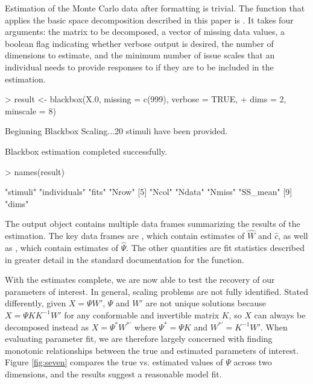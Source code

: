 \documentclass[nojss]{jss}
\begin{document}
Estimation of the Monte Carlo data after formatting is trivial. The function that applies the basic space
decomposition described in this paper is .  It takes four arguments: the matrix to
be decomposed, a vector of missing data values, a boolean flag indicating whether verbose output is
desired, the number of dimensions to estimate, and the minimum number of issue scales that an individual
needs to provide responses to if they are to be included in the estimation.

\begin{Schunk}
\begin{Sinput}
> result <- blackbox(X.0, missing = c(999), verbose = TRUE, 
+     dims = 2, minscale = 8)
\end{Sinput}
\begin{Soutput}
	Beginning Blackbox Scaling...20 stimuli have been provided.

	Blackbox estimation completed successfully.
\end{Soutput}
\begin{Sinput}
> names(result)
\end{Sinput}
\begin{Soutput}
[1] "stimuli"     "individuals" "fits"        "Nrow"       
[5] "Ncol"        "Ndata"       "Nmiss"       "SS_mean"    
[9] "dims"       
\end{Soutput}
\end{Schunk}

The output object contains multiple data frames summarizing the results of the estimation. The key data
frames are , which contain estimates of $\hat{W}$ and $\hat{c}$, as well as ,
which contain estimates of $\hat{\Psi}$.  The other quantities are fit statistics described in greater
detail in the standard documentation for the function.

With the estimates complete, we are now able to test the recovery of our parameters of interest. In general,
scaling problems are not fully identified. Stated differently, given $X = \Psi W'$, $\Psi$ and $W'$ are not
unique solutions because $X = \Psi K K^{-1} W'$ for any conformable and invertible matrix $K$, so $X$ can
always be decomposed instead as $X = \Psi^* W^{*'}$ where $\Psi^* = \Psi K$ and $W^{*'} = K^{-1} W'$. 
When evaluating parameter fit, we are therefore largely concerned with finding monotonic relationships between
the true and estimated parameters of interest.  Figure \ref{fig:seven} compares the true vs. estimated values of
$\Psi$ across two dimensions, and the results suggest a reasonable model fit.
\end{document}
